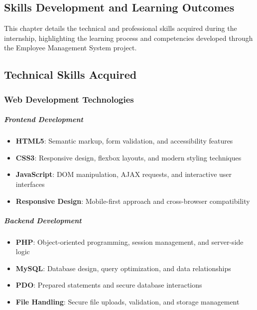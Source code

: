\begin{center}
    \chapter{Skills Development and Learning Outcomes}
\end{center}
\label{chap:skills-development}

\noindent This chapter details the technical and professional skills acquired during the internship, highlighting the learning process and competencies developed through the Employee Management System project.

\section{Technical Skills Acquired}

\subsection{Web Development Technologies}

\paragraph{Frontend Development}
\begin{itemize}
    \item \textbf{HTML5}: Semantic markup, form validation, and accessibility features
    \item \textbf{CSS3}: Responsive design, flexbox layouts, and modern styling techniques
    \item \textbf{JavaScript}: DOM manipulation, AJAX requests, and interactive user interfaces
    \item \textbf{Responsive Design}: Mobile-first approach and cross-browser compatibility
\end{itemize}

\paragraph{Backend Development}
\begin{itemize}
    \item \textbf{PHP}: Object-oriented programming, session management, and server-side logic
    \item \textbf{MySQL}: Database design, query optimization, and data relationships
    \item \textbf{PDO}: Prepared statements and secure database interactions
    \item \textbf{File Handling}: Secure file uploads, validation, and storage management
\end{itemize}

